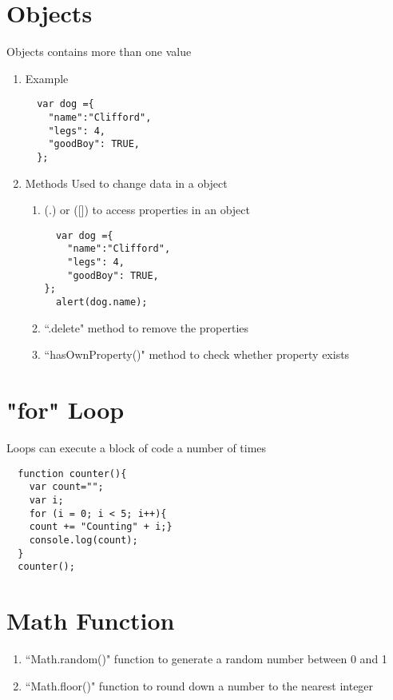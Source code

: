 \documentclass{article}
\begin{document}
\section{Objects}
Objects contains more than one value
\begin{enumerate}
\item Example
\begin{lstlisting}
  var dog ={
    "name":"Clifford",
    "legs": 4,
    "goodBoy": TRUE,
  };
\end{lstlisting}
\item Methods
Used to change data in a object
\begin{enumerate}
\item (.) or ([]) to access properties in an object
\begin{lstlisting}
  var dog ={
    "name":"Clifford",
    "legs": 4,
    "goodBoy": TRUE,
};
  alert(dog.name);
\end{lstlisting}
\item ``.delete" method
to remove the properties
\item ``hasOwnProperty()" method
to check whether property exists
\end{enumerate}
\end{enumerate}
\section{"for" Loop}
Loops can execute a block of code a number of times
\begin{lstlisting}
  function counter(){
    var count="";
    var i;
    for (i = 0; i < 5; i++){
    count += "Counting" + i;}
    console.log(count);
  }
  counter();
\end{lstlisting}
\section{Math Function}
\begin{enumerate}
\item ``Math.random()" function
to generate a random number between 0 and 1
\item ``Math.floor()" function
to round down a number to the nearest integer
\end{enumerate}
\end{document}
